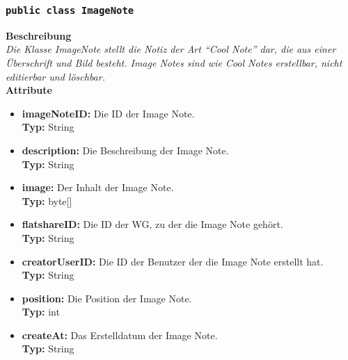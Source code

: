 \subsubsection{\texttt{public class ImageNote}}

	\textbf{Beschreibung} \\
	\textit{Die Klasse ImageNote stellt die Notiz der Art “Cool Note” dar, die aus einer Überschrift und Bild besteht. Image Notes sind wie Cool Notes erstellbar, nicht editierbar und löschbar.} \\
	
	\textbf{Attribute}
	\begin{itemize}
		\item \textbf{imageNoteID:} Die ID der Image Note. \\
		\textbf{Typ:} String
		\item \textbf{description:} Die Beschreibung der Image Note. \\
		\textbf{Typ:} String
		\item \textbf{image:} Der Inhalt der Image Note. \\
		\textbf{Typ:} byte[]
		\item \textbf{flatshareID:} Die ID der WG, zu der die Image Note gehört. \\
		\textbf{Typ:} String
		\item \textbf{creatorUserID:} Die ID der Benutzer der die Image Note erstellt hat. \\
		\textbf{Typ:} String
		\item \textbf{position:} Die Position der Image Note. \\
		\textbf{Typ:} int
		\item \textbf{createAt:} Das Erstelldatum der Image Note.\\
		\textbf{Typ:} String
	\end{itemize}
	
